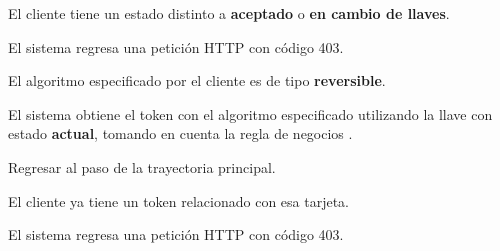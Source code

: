 {\begin{trayectoriaPrincipal}
  \end{trayectoriaPrincipal}

  \begin{trayectoriaAlternativa}
    {El cliente tiene un estado distinto a \textbf{aceptado} o
      \textbf{en cambio de llaves}.}

      \item El sistema regresa una petición HTTP con código 403.

  \end{trayectoriaAlternativa}

  \begin{trayectoriaAlternativa}
    {El algoritmo especificado por el cliente es de tipo \textbf{reversible}.}

    \item El sistema obtiene el token con el algoritmo especificado utilizando
      la llave con estado \textbf{actual}, tomando en cuenta la regla de
      negocios .

    \item Regresar al paso  de la trayectoria
      principal.

  \end{trayectoriaAlternativa}

  \begin{trayectoriaAlternativa}
    {El cliente ya tiene un token relacionado con esa tarjeta.}

    \item El sistema regresa una petición HTTP con código 403.

  \end{trayectoriaAlternativa}

}

